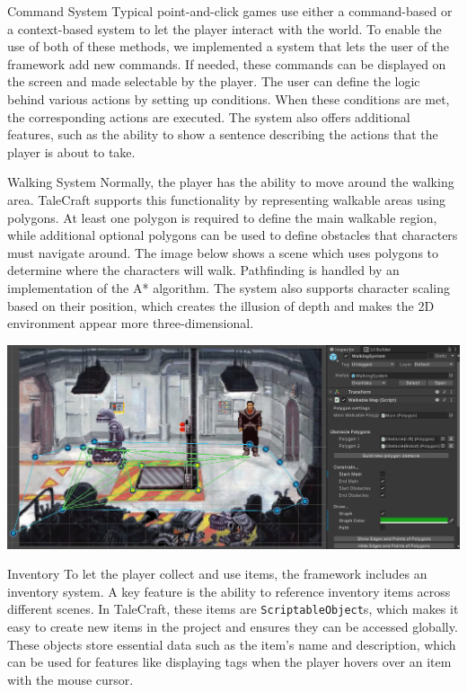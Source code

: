 \documentclass[portrait,a0paper,fontscale=0.33]{baposter}
\begin{document}
\begin{poster}
\begin{posterbox}[column=0, span=1, name=cs, below=architecture]{Command System}
Typical point-and-click games use either a command-based or a context-based system to let the player interact with the world. To enable the use of both of these methods, we implemented a system that lets the user of the framework add new commands. If needed, these commands can be displayed on the screen and made selectable by the player. The user can define the logic behind various actions by setting up conditions. When these conditions are met, the corresponding actions are executed.  The system also offers additional features, such as the ability to show a sentence describing the actions that the player is about to take.


\end{posterbox}

\begin{posterbox}[column=0, span=1, name=ws, below=cs]{Walking System}
Normally, the player has the ability to move around the walking area. TaleCraft supports this functionality by representing walkable areas using polygons. At least one polygon is required to define the main walkable region, while additional optional polygons can be used to define obstacles that characters must navigate around. The image below shows a scene which uses polygons to determine where the characters will walk. Pathfinding is handled by an implementation of the A* algorithm. The system also supports character scaling based on their position, which creates the illusion of depth and makes the 2D environment appear more three-dimensional. 

\begin{center}
\includegraphics[width=0.75\linewidth]{img/walkable_map3.png}
\end{center}
\end{posterbox}

%
%
%

\begin{posterbox}[column=1, span=1, name=is]{Inventory}
To let the player collect and use items, the framework includes an inventory system. A key feature is the ability to reference inventory items across different scenes. In TaleCraft, these items are \verb|ScriptableObject|s, which makes it easy to create new items in the project and ensures they can be accessed globally. These objects store essential data such as the item's name and description, which can be used for features like displaying tags when the player hovers over an item with the mouse cursor.
\end{posterbox}


\end{poster}
\end{document}
